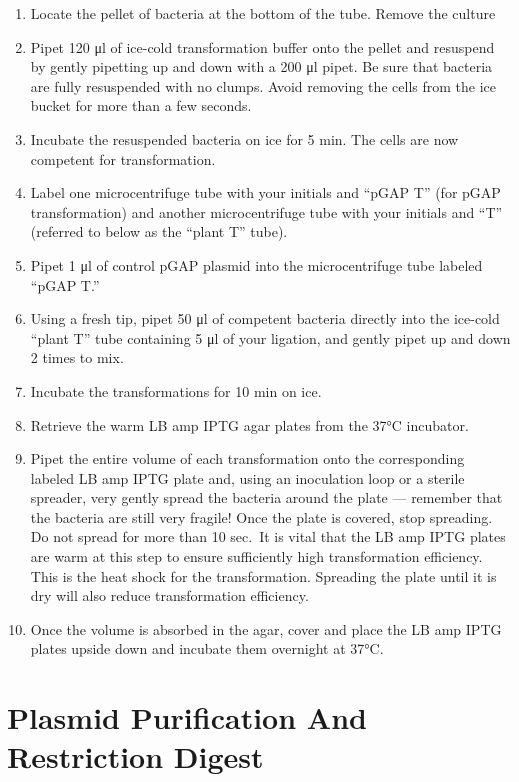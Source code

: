\documentclass[]{book}
\providecommand{\tightlist}{%
  \setlength{\itemsep}{0pt}\setlength{\parskip}{0pt}}
\theoremstyle{definition}
\theoremstyle{definition}
\theoremstyle{definition}
\theoremstyle{remark}
\begin{document}
\begin{enumerate}
\def\labelenumi{\arabic{enumi}.}
\setcounter{enumi}{7}
\tightlist
\item
  Locate the pellet of bacteria at the bottom of the tube. Remove the
  culture
\item
  Pipet 120 μl of ice-cold transformation buffer onto the pellet and
  resuspend by gently pipetting up and down with a 200 μl pipet. Be sure
  that bacteria are fully resuspended with no clumps. Avoid removing the
  cells from the ice bucket for more than a few seconds.
\item
  Incubate the resuspended bacteria on ice for 5 min. The cells are now
  competent for transformation.
\item
  Label one microcentrifuge tube with your initials and ``pGAP T'' (for
  pGAP transformation) and another microcentrifuge tube with your
  initials and ``T'' (referred to below as the ``plant T'' tube).
\item
  Pipet 1 μl of control pGAP plasmid into the microcentrifuge tube
  labeled ``pGAP T.''
\item
  Using a fresh tip, pipet 50 μl of competent bacteria directly into the
  ice-cold ``plant T'' tube containing 5 μl of your ligation, and gently
  pipet up and down 2 times to mix.
\item
  Incubate the transformations for 10 min on ice.
\item
  Retrieve the warm LB amp IPTG agar plates from the 37°C incubator.
\item
  Pipet the entire volume of each transformation onto the corresponding
  labeled LB amp IPTG plate and, using an inoculation loop or a sterile
  spreader, very gently spread the bacteria around the plate ---
  remember that the bacteria are still very fragile! Once the plate is
  covered, stop spreading. Do not spread for more than 10 sec.~It is
  vital that the LB amp IPTG plates are warm at this step to ensure
  sufficiently high transformation efficiency. This is the heat shock
  for the transformation. Spreading the plate until it is dry will also
  reduce transformation efficiency.
\item
  Once the volume is absorbed in the agar, cover and place the LB amp
  IPTG plates upside down and incubate them overnight at 37°C.
\end{enumerate}

\chapter{Plasmid Purification And Restriction
Digest}\label{plasmid-purification-and-restriction-digest}
\end{document}
